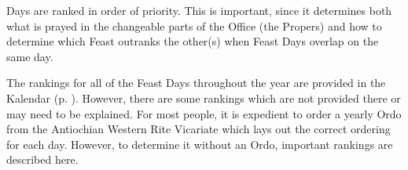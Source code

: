\newpage
{}
{}\label{ranking}
\noindent
{} Days are ranked in order of priority. This is important, since it determines both what is prayed in the changeable parts of the Office (the Propers) and how to determine which Feast outranks the other(s) when Feast Days overlap on the same day.\par
The rankings for all of the Feast Days throughout the year are provided in the Kalendar (p. \pageref{kalendar}). However, there are some rankings which are not provided there or may need to be explained. For most people, it is expedient to order a yearly Ordo from the Antiochian Western Rite Vicariate which lays out the correct ordering for each day. However, to determine it without an Ordo, important rankings are described here.
